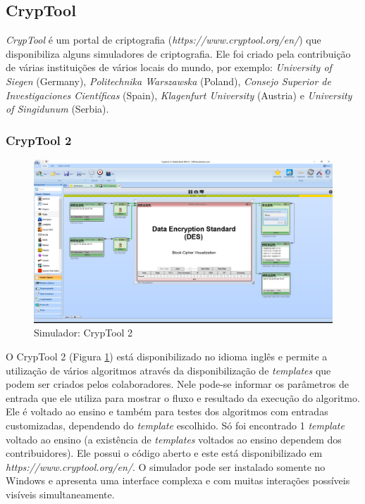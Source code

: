 \subsection{CrypTool}

\textit{CrypTool} é um portal de criptografia (\textit{https://www.cryptool.org/en/}) que disponibiliza alguns simuladores de criptografia. Ele foi criado pela contribuição de várias instituições de vários locais do mundo, por exemplo: \textit{University of Siegen} (Germany), \textit{Politechnika Warszawska} (Poland), \textit{Consejo Superior de Investigaciones Científicas} (Spain), \textit{Klagenfurt University} (Austria) e \textit{University of Singidunum} (Serbia). \cite{cryptool20}

\subsubsection{CrypTool 2}

\begin{figure}[H]
    \centering
    \caption{Simulador: CrypTool 2}
    \label{fig:cryptool2}
    \includegraphics[width=1.2\linewidth,center]{Simuladores/CrypTool2.png}
\end{figure}

O CrypTool 2 (Figura \ref{fig:cryptool2}) está disponibilizado no idioma inglês e permite a utilização de vários algoritmos através da disponibilização de \textit{templates} que podem ser criados pelos colaboradores. Nele pode-se informar os parâmetros de entrada que ele utiliza para mostrar o fluxo e resultado da execução do algoritmo. Ele é voltado ao ensino e também para testes dos algoritmos com entradas customizadas, dependendo do \textit{template} escolhido. Só foi encontrado 1 \textit{template} voltado ao ensino (a existência de \textit{templates} voltados ao ensino dependem dos contribuidores). Ele possui o código aberto e este está disponibilizado em \textit{https://www.cryptool.org/en/}. O simulador pode ser instalado somente no Windows e apresenta uma interface complexa e com muitas interações possíveis visíveis simultaneamente. \cite{cryptool14}

